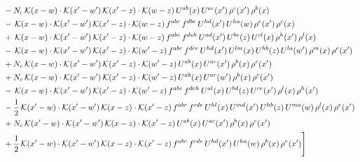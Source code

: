 \documentclass[9pt]{article}
\numberwithin{equation}{section}
\begin{document}
\begin{align}
& -N_{c}\,\mathcal{K}(x-w)\cdot\mathcal{K}(x'-w')\,\mathcal{K}(x'-z)\cdot\mathcal{K}(w-z)\,U^{ab}(x)\,U^{ac}(x')\,\rho^{c}(x')\,\rho^{b}(x)\notag\\
& -\,\mathcal{K}(x-w)\cdot\mathcal{K}(x'-w')\,\mathcal{K}(x'-z)\cdot\mathcal{K}(w-z)\,f^{abc}\,f^{dbe}\,U^{hd}(x')\,U^{ha}(w)\,\rho^{e}(x')\,\rho^{c}(x)\notag\\
& +\,\mathcal{K}(x-w)\cdot\mathcal{K}(x'-w')\,\mathcal{K}(x'-z)\cdot\mathcal{K}(w-z)\,f^{abc}\,f^{deh}\,U^{ad}(x')\,U^{be}(z)\,U^{cl}(x)\,\rho^{h}(x')\,\rho^{l}(x)\notag\\
& -\,\mathcal{K}(x-w)\cdot\mathcal{K}(x'-w')\,\mathcal{K}(x'-z)\cdot\mathcal{K}(w'-z)\,f^{abc}\,f^{dce}\,U^{hd}(x')\,U^{lm}(x)\,U^{hb}(z)\,U^{la}(w')\,\rho^{m}(x)\,\rho^{e}(x')\notag\\
& +N_{c}\,\mathcal{K}(x-w)\cdot\mathcal{K}(x'-w')\,\mathcal{K}(x'-z)\cdot\mathcal{K}(w'-z)\,U^{ab}(x)\,U^{ac}(x')\,\rho^{b}(x)\,\rho^{c}(x')\notag\\
& +N_{c}\,\mathcal{K}(x-w)\cdot\mathcal{K}(x'-w')\,\mathcal{K}(x'-z)\cdot\mathcal{K}(w'-z)\,U^{ab}(x)\,U^{ac}(w')\,\rho^{b}(x)\,\rho^{c}(x')\notag\\
& -\,\mathcal{K}(x-w)\cdot\mathcal{K}(x'-w')\,\mathcal{K}(x'-z)\cdot\mathcal{K}(w'-z)\,f^{abc}\,f^{deh}\,U^{al}(x)\,U^{bd}(z)\,U^{ce}(x')\,\rho^{l}(x)\,\rho^{h}(x')\notag\\
& -\frac{1}{2}\,\mathcal{K}(x'-w)\cdot\mathcal{K}(x'-w')\,\mathcal{K}(x-z)\cdot\mathcal{K}(x'-z)\,f^{abc}\,f^{cde}\,U^{hl}(x)\,U^{md}(x')\,U^{hb}(z)\,U^{ma}(w)\,\rho^{l}(x)\,\rho^{e}(x')\notag\\
& +N_{c}\,\mathcal{K}(x'-w)\cdot\mathcal{K}(x'-w')\,\mathcal{K}(x-z)\cdot\mathcal{K}(x'-z)\,U^{ab}(x)\,U^{ac}(x')\,\rho^{b}(x)\,\rho^{c}(x')\notag\\
& +\frac{1}{2}\,\mathcal{K}(x'-w)\cdot\mathcal{K}(x'-w')\,\mathcal{K}(x-z)\cdot\mathcal{K}(x'-z)\,f^{abc}\,f^{cde}\,U^{hd}(x')\,U^{ha}(w)\,\rho^{b}(x)\,\rho^{e}(x')\Bigg]
\end{align}
\end{document}
